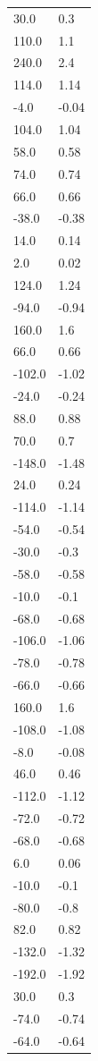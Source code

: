\begin{longtable}{ll}
30.0 & 0.3 \\
110.0 & 1.1 \\
240.0 & 2.4 \\
114.0 & 1.14 \\
-4.0 & -0.04 \\
104.0 & 1.04 \\
58.0 & 0.58 \\
74.0 & 0.74 \\
66.0 & 0.66 \\
-38.0 & -0.38 \\
14.0 & 0.14 \\
2.0 & 0.02 \\
124.0 & 1.24 \\
-94.0 & -0.94 \\
160.0 & 1.6 \\
66.0 & 0.66 \\
-102.0 & -1.02 \\
-24.0 & -0.24 \\
88.0 & 0.88 \\
70.0 & 0.7 \\
-148.0 & -1.48 \\
24.0 & 0.24 \\
-114.0 & -1.14 \\
-54.0 & -0.54 \\
-30.0 & -0.3 \\
-58.0 & -0.58 \\
-10.0 & -0.1 \\
-68.0 & -0.68 \\
-106.0 & -1.06 \\
-78.0 & -0.78 \\
-66.0 & -0.66 \\
160.0 & 1.6 \\
-108.0 & -1.08 \\
-8.0 & -0.08 \\
46.0 & 0.46 \\
-112.0 & -1.12 \\
-72.0 & -0.72 \\
-68.0 & -0.68 \\
6.0 & 0.06 \\
-10.0 & -0.1 \\
-80.0 & -0.8 \\
82.0 & 0.82 \\
-132.0 & -1.32 \\
-192.0 & -1.92 \\
30.0 & 0.3 \\
-74.0 & -0.74 \\
-64.0 & -0.64 \\

\end{longtable}
